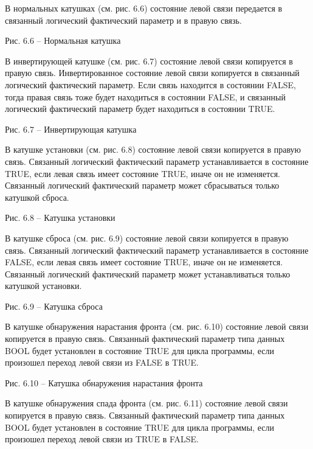 \documentclass[letterpaper,10pt,russian]{sphinxmanual}
\begin{document}
В нормальных катушках (см. рис. 6.6) состояние левой связи передается в
связанный логический фактический параметр и в правую связь.


Рис. 6.6 – Нормальная катушка

В инвертирующей катушке (см. рис. 6.7) состояние левой связи копируется
в правую связь. Инвертированное состояние левой связи копируется в
связанный логический фактический параметр. Если связь находится в
состоянии FALSE, тогда правая связь тоже будет находиться в состоянии
FALSE, и связанный логический фактический параметр будет находиться в
состоянии TRUE.


Рис. 6.7 – Инвертирующая катушка

В катушке установки (см. рис. 6.8) состояние левой связи копируется в
правую связь. Связанный логический фактический параметр устанавливается
в состояние TRUE, если левая связь имеет состояние TRUE, иначе он не
изменяется. Связанный логический фактический параметр может сбрасываться
только катушкой сброса.


Рис. 6.8 – Катушка установки

В катушке сброса (см. рис. 6.9) состояние левой связи копируется в
правую связь. Связанный логический фактический параметр устанавливается
в состояние FALSE, если левая связь имеет состояние TRUE, иначе он не
изменяется. Связанный логический фактический параметр может
устанавливаться только катушкой установки.


Рис. 6.9 – Катушка сброса

В катушке обнаружения нарастания фронта (см. рис. 6.10) состояние левой
связи копируется в правую связь. Связанный фактический параметр типа
данных BOOL будет установлен в состояние TRUE для цикла программы, если
произошел переход левой связи из FALSE в TRUE.


Рис. 6.10 – Катушка обнаружения нарастания фронта

В катушке обнаружения спада фронта (см. рис. 6.11) состояние левой связи
копируется в правую связь. Связанный фактический параметр типа данных
BOOL будет установлен в состояние TRUE для цикла программы, если
произошел переход левой связи из TRUE в FALSE.
\end{document}
